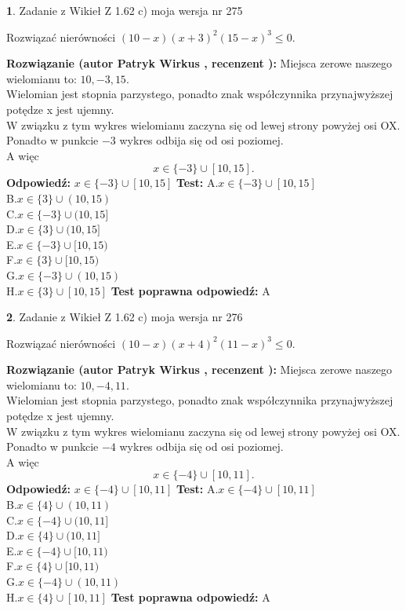 \documentclass[12pt, a4paper]{article}
\theoremstyle{definition} %
\newtheorem{zad}{}
\newcommand{\zadStart}[1]{\begin{zad}#1\newline}
\newcommand{\zadStop}{\end{zad}}
\newcommand{\rozwStart}[2]{\noindent \textbf{Rozwiązanie (autor #1 , recenzent #2): }\newline}
\newcommand{\rozwStop}{\newline}
\newcommand{\odpStart}{\noindent \textbf{Odpowiedź:}\newline}
\newcommand{\odpStop}{\newline}
\newcommand{\testStart}{\noindent \textbf{Test:}\newline}
\newcommand{\testStop}{\newline}
\newcommand{\kluczStart}{\noindent \textbf{Test poprawna odpowiedź:}\newline}
\newcommand{\kluczStop}{\newline}
\begin{document}
\zadStart{Zadanie z Wikieł Z 1.62 c) moja wersja nr 275}

Rozwiązać nierówności $(10-x)(x+3)^{2}(15-x)^{3}\le0$.
\zadStop
\rozwStart{Patryk Wirkus}{}
Miejsca zerowe naszego wielomianu to: $10, -3, 15$.\\
Wielomian jest stopnia parzystego, ponadto znak współczynnika przy\linebreak najwyższej potędze x jest ujemny.\\ W związku z tym wykres wielomianu zaczyna się od lewej strony powyżej osi OX.\\
Ponadto w punkcie $-3$ wykres odbija się od osi poziomej.\\
A więc $$x \in \{-3\} \cup [10,15].$$
\rozwStop
\odpStart
$x \in \{-3\} \cup [10,15]$
\odpStop
\testStart
A.$x \in \{-3\} \cup [10,15]$\\
B.$x \in \{3\} \cup (10,15)$\\
C.$x \in \{-3\} \cup (10,15]$\\
D.$x \in \{3\} \cup (10,15]$\\
E.$x \in \{-3\} \cup [10,15)$\\
F.$x \in \{3\} \cup [10,15)$\\
G.$x \in \{-3\} \cup (10,15)$\\
H.$x \in \{3\} \cup [10,15]$
\testStop
\kluczStart
A
\kluczStop



\zadStart{Zadanie z Wikieł Z 1.62 c) moja wersja nr 276}

Rozwiązać nierówności $(10-x)(x+4)^{2}(11-x)^{3}\le0$.
\zadStop
\rozwStart{Patryk Wirkus}{}
Miejsca zerowe naszego wielomianu to: $10, -4, 11$.\\
Wielomian jest stopnia parzystego, ponadto znak współczynnika przy\linebreak najwyższej potędze x jest ujemny.\\ W związku z tym wykres wielomianu zaczyna się od lewej strony powyżej osi OX.\\
Ponadto w punkcie $-4$ wykres odbija się od osi poziomej.\\
A więc $$x \in \{-4\} \cup [10,11].$$
\rozwStop
\odpStart
$x \in \{-4\} \cup [10,11]$
\odpStop
\testStart
A.$x \in \{-4\} \cup [10,11]$\\
B.$x \in \{4\} \cup (10,11)$\\
C.$x \in \{-4\} \cup (10,11]$\\
D.$x \in \{4\} \cup (10,11]$\\
E.$x \in \{-4\} \cup [10,11)$\\
F.$x \in \{4\} \cup [10,11)$\\
G.$x \in \{-4\} \cup (10,11)$\\
H.$x \in \{4\} \cup [10,11]$
\testStop
\kluczStart
A
\kluczStop
\end{document}
